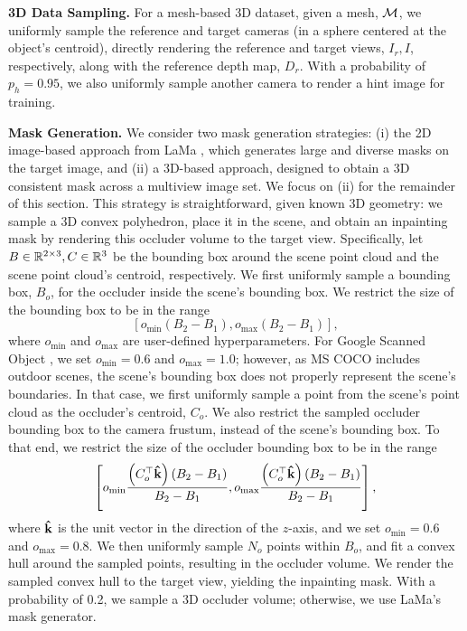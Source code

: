 \noindent\textbf{3D Data Sampling.}
For a mesh-based 3D dataset, given a mesh, $\mathcal{M}$, we uniformly sample the reference and target cameras (in a sphere centered at the object's centroid), directly rendering the reference and target views, $I_r, I$, respectively, along with the reference depth map, $D_r$. With a probability of $p_h = 0.95$, we also uniformly sample another camera to render a hint image for training.

\noindent\textbf{Mask Generation.}
We consider two mask generation strategies:
(i) the 2D image-based approach from LaMa \cite{lama},
which generates large and diverse masks on the target image,
and
(ii) a 3D-based approach, designed to obtain a 3D consistent mask across a multiview image set.
We focus on (ii) for the remainder of this section.
This strategy is straightforward, given known 3D geometry:
we sample a 3D convex polyhedron, place it in the scene, and obtain an inpainting mask by rendering this occluder volume to the target view.
Specifically, let $B \in \mathbb{R}^{2 \times 3}, C \in \mathbb{R}^3$ be the bounding box around the scene point cloud and the scene point cloud's centroid, respectively. We first uniformly sample a bounding box, $B_o$, for the occluder inside the scene's bounding box. We restrict the size of the bounding box to be in the range
\begin{equation}
\left[
    o_\text{min} (B_2 - B_1), o_\text{max} (B_2 - B_1)
\right],
\end{equation}
where $o_\text{min}$ and $o_\text{max}$ are user-defined hyperparameters. For Google Scanned Object \cite{gso.dataset}, we set $o_\text{min} = 0.6$ and $o_\text{max} = 1.0$; however, as MS COCO \cite{coco.dataset} includes outdoor scenes, the scene's bounding box does not properly represent the scene's boundaries. In that case, we first uniformly sample a point from the scene's point cloud as the occluder's centroid, $C_o$. We also restrict the sampled occluder bounding box to the camera frustum, instead of the scene's bounding box. To that end, we restrict the size of the occluder bounding box to be in the range
\begin{equation}
\left[
    o_\text{min} \frac{\left(C_o^\top \boldsymbol{\hat{\textbf{k}}}\right) (B_2 - B_1)}{B_2 - B_1}, o_\text{max} \frac{\left(C_o^\top \boldsymbol{\hat{\textbf{k}}}\right) (B_2 - B_1)}{B_2 - B_1}
\right],
\end{equation}
where $\boldsymbol{\hat{\textbf{k}}}$ is the unit vector in the direction of the $z$-axis, and we set $o_\text{min} = 0.6$ and $ o_\text{max} = 0.8$. We then uniformly sample $N_o$ points within $B_o$, and fit a convex hull around the sampled points, resulting in the occluder volume. We render the sampled convex hull to the target view, yielding the inpainting mask. With a probability of 0.2, we sample a 3D occluder volume; otherwise, we use LaMa's mask generator.

